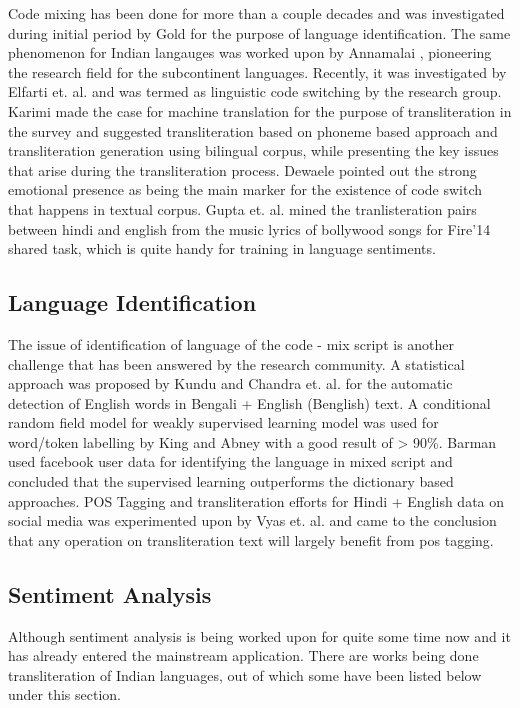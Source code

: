\documentclass[conference]{IEEEtran}
\begin{document}
Code mixing has been done for more than a couple decades and was investigated
during initial period by Gold \cite{gold_language_1967} for the purpose of
language identification. The same phenomenon for Indian langauges was worked
upon by Annamalai \cite{annamalai_anglicized_1978}, pioneering the research
field for the subcontinent languages. Recently, it was investigated by Elfarti
et. al. \cite{elfardy_token_2012} and was termed as linguistic code switching
by the research group. Karimi \cite{karimi_machine_2011} made the case for
machine translation for the purpose of transliteration in the survey and
suggested transliteration based on phoneme based approach and transliteration
generation using bilingual corpus, while presenting the key issues that arise
during the transliteration process. Dewaele \cite{dewaele_emotions_2010}
pointed out the strong emotional presence as being the main marker for the
existence of code switch that happens in textual corpus. Gupta et. al.
\cite{gupta_mining_2012} mined the tranlisteration pairs between hindi and
english from the music lyrics of bollywood songs for Fire'14 shared task, which
is quite handy for training in language sentiments. 

\subsection{Language Identification}
The issue of identification of language of the code - mix script is another
challenge that has been answered by the research community. A statistical
approach was proposed by Kundu and Chandra et. al. \cite{kundu_automatic_2012}
for the automatic detection of English words in Bengali + English (Benglish)
text. A conditional random field model for weakly supervised learning model was
used for word/token labelling by King and Abney \cite{king_labeling_2013} with
a good result of > 90\%. Barman \cite{barman_code_2014} used facebook user data
for identifying the language in mixed script and concluded that the supervised
learning outperforms the dictionary based approaches. POS Tagging and
transliteration efforts for Hindi + English data on social media was
experimented upon by Vyas et. al. \cite{vyas_pos_2014} and came to the
conclusion that any operation on transliteration text will largely benefit from
pos tagging. 

\subsection{Sentiment Analysis}
Although sentiment analysis is being worked upon for quite some time now and it
has already entered the mainstream application. There are works being done
transliteration of Indian languages, out of which some have been listed below
under this section.\\
\end{document}
